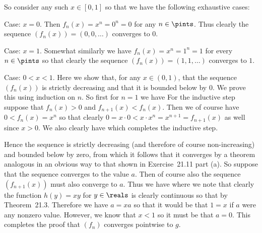 {{    So consider any such $x \in [0,1]$ so that we have the following exhaustive cases:

    Case: $x = 0$.
    Then $f_n(x) = x^n = 0^n = 0$ for any $n \in \pints$.
    Thus clearly the sequence $(f_n(x)) = (0,0,\ldots)$ converges to $0$.

    Case: $x = 1$.
    Somewhat similarly we have $f_n(x) = x^n = 1^n = 1$ for every $n \in \pints$ so that clearly the sequence $(f_n(x)) = (1,1,\ldots)$ converges to $1$.

    Case: $0 < x < 1$.
    Here we show that, for any $x \in (0,1)$, that the sequence $(f_n(x))$ is strictly decreasing and that it is bounded below by $0$.
    We prove this using induction on $n$.
    So first for $n = 1$ we have
    For the inductive step suppose that $f_n(x) > 0$ and $f_{n+1}(x) < f_n(x)$.
    Then we of course have $0 < f_n(x) = x^n$ so that clearly $0 = x \cdot 0 < x \cdot x^n = x^{n+1} = f_{n+1}(x)$ as well since $x > 0$.
    We also clearly have
    which completes the inductive step.
    
    Hence the sequence is strictly decreasing (and therefore of course non-increasing) and bounded below by zero, from which it follows that it converges by a theorem analogous in an obvious way to that shown in Exercise~21.11 part (a).
    So suppose that the sequence converges to the value $a$.
    Then of course also the sequence $(f_{n+1}(x))$ must also converge to $a$.
    Thus we have
    where we note that clearly the function $h(y) = xy$ for $y \in \reals$ is clearly continuous so that
    by Theorem~21.3.
    Therefore we have $a = xa$ so that it would be that $1 = x$ if $a$ were any nonzero value.
    However, we know that $x < 1$ so it must be that $a = 0$.
    This completes the proof that $(f_n)$ converges pointwise to $g$.

}}

